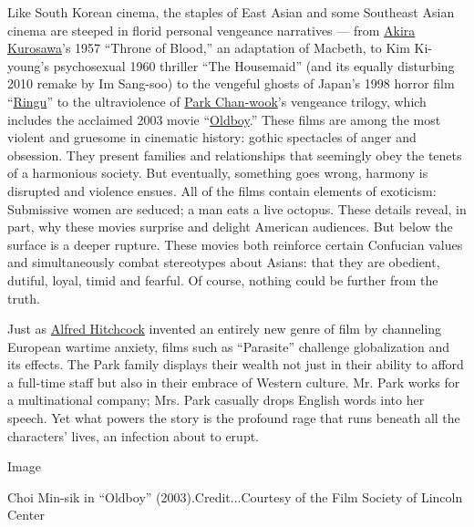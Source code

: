 Like South Korean cinema, the staples of East Asian and some Southeast
Asian cinema are steeped in florid personal vengeance narratives ---
from
\href{https://www.nytimes3xbfgragh.onion/1998/09/07/movies/akira-kurosawa-film-director-is-dead-at-88.html}{Akira
Kurosawa}'s 1957 ``Throne of Blood,'' an adaptation of Macbeth, to Kim
Ki-young's psychosexual 1960 thriller ``The Housemaid'' (and its equally
disturbing 2010 remake by Im Sang-soo) to the vengeful ghosts of Japan's
1998 horror film
``\href{https://www.nytimes3xbfgragh.onion/watching/titles/movies/20369}{Ringu}''
to the ultraviolence of
\href{https://www.nytimes3xbfgragh.onion/2017/10/16/t-magazine/park-chan-wook.html}{Park
Chan-wook}'s vengeance trilogy, which includes the acclaimed 2003 movie
``\href{https://www.nytimes3xbfgragh.onion/watching/recommendations/oldboy}{Oldboy}.''
These films are among the most violent and gruesome in cinematic
history: gothic spectacles of anger and obsession. They present families
and relationships that seemingly obey the tenets of a harmonious
society. But eventually, something goes wrong, harmony is disrupted and
violence ensues. All of the films contain elements of exoticism:
Submissive women are seduced; a man eats a live octopus. These details
reveal, in part, why these movies surprise and delight American
audiences. But below the surface is a deeper rupture. These movies both
reinforce certain Confucian values and simultaneously combat stereotypes
about Asians: that they are obedient, dutiful, loyal, timid and fearful.
Of course, nothing could be further from the truth.

Just as
\href{https://www.nytimes3xbfgragh.onion/topic/person/alfred-hitchcock}{Alfred
Hitchcock} invented an entirely new genre of film by channeling European
wartime anxiety, films such as ``Parasite'' challenge globalization and
its effects. The Park family displays their wealth not just in their
ability to afford a full-time staff but also in their embrace of Western
culture. Mr. Park works for a multinational company; Mrs. Park casually
drops English words into her speech. Yet what powers the story is the
profound rage that runs beneath all the characters' lives, an infection
about to erupt.

Image

Choi Min-sik in ``Oldboy'' (2003).Credit...Courtesy of the Film Society
of Lincoln Center

